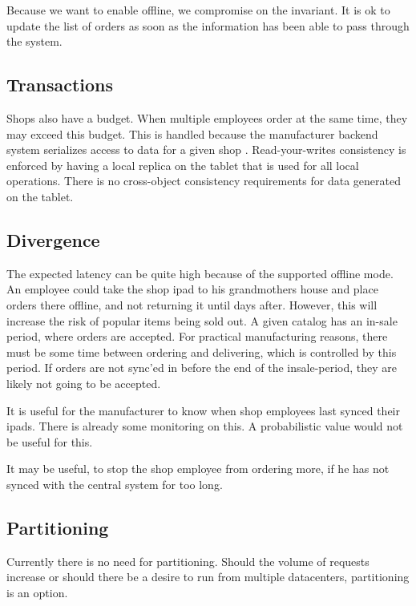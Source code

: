 \documentclass[11pt,a4paper]{report}
\begin{document}
Because we want to enable offline, we compromise on the invariant. It is ok to update the list of orders as soon as the information has been able to pass through the system.

\subsection{Transactions}
Shops also have a budget. When multiple employees order at the same time, they may exceed this budget. This is handled because the manufacturer backend system serializes access to data for a given shop
.
Read-your-writes consistency is enforced by having a local replica on the tablet that is used for all local operations.
There is no cross-object consistency requirements for data generated on the tablet.
\subsection{Divergence}
The expected latency can be quite high because of the supported offline mode. An employee could take the shop ipad to his grandmothers house and place orders there offline, and not returning it until days after.
However, this will increase the risk of popular items being sold out.
A given catalog has an in-sale period, where orders are accepted. For practical manufacturing reasons, there must be some time between ordering and delivering, which is controlled by this period. If orders are not sync'ed in before the end of the insale-period, they are likely not going to be accepted.

It is useful for the manufacturer to know when shop employees last synced their ipads. There is already some monitoring on this. A probabilistic value would not be useful for this.

It may be useful, to stop the shop employee from ordering more, if he has not synced with the central system for too long.

\subsection{Partitioning}
Currently there is no need for partitioning. Should the volume of requests increase or should there be a desire to run from multiple datacenters, partitioning is an option.
\end{document}
